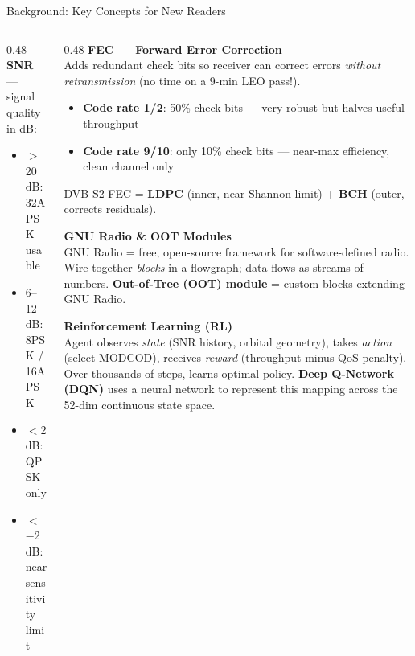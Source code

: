 \documentclass[aspectratio=169,10pt]{beamer}
\begin{document}
\begin{frame}{Background: Key Concepts for New Readers}
\begin{columns}[T]
\begin{column}{0.48\textwidth}
      \textbf{SNR} — signal quality in dB:
      \begin{itemize}\scriptsize
        \item $>$20 dB: 32APSK usable
        \item 6--12 dB: 8PSK / 16APSK
        \item $<$2 dB: QPSK only
        \item $<$$-$2 dB: near sensitivity limit
      \end{itemize}
    \end{column}
    \begin{column}{0.48\textwidth}
      \textbf{FEC — Forward Error Correction}\\
      \scriptsize Adds redundant check bits so receiver can correct errors \emph{without retransmission} (no time on a 9-min LEO pass!).
      \begin{itemize}\scriptsize
        \item \textbf{Code rate 1/2}: 50\% check bits — very robust but halves useful throughput
        \item \textbf{Code rate 9/10}: only 10\% check bits — near-max efficiency, clean channel only
      \end{itemize}
      DVB-S2 FEC = \textbf{LDPC} (inner, near Shannon limit) + \textbf{BCH} (outer, corrects residuals).

      \vspace{0.4em}
      \textbf{GNU Radio \& OOT Modules}\\
      \scriptsize GNU Radio = free, open-source framework for software-defined radio.
      Wire together \emph{blocks} in a flowgraph; data flows as streams of numbers.
      \textbf{Out-of-Tree (OOT) module} = custom blocks extending GNU Radio.

      \vspace{0.4em}
      \textbf{Reinforcement Learning (RL)}\\
      \scriptsize Agent observes \emph{state} (SNR history, orbital geometry), takes \emph{action} (select MODCOD), receives \emph{reward} (throughput minus QoS penalty). Over thousands of steps, learns optimal policy.
      \textbf{Deep Q-Network (DQN)} uses a neural network to represent this mapping across the 52-dim continuous state space.
    \end{column}
  \end{columns}
\end{frame}
\end{document}
